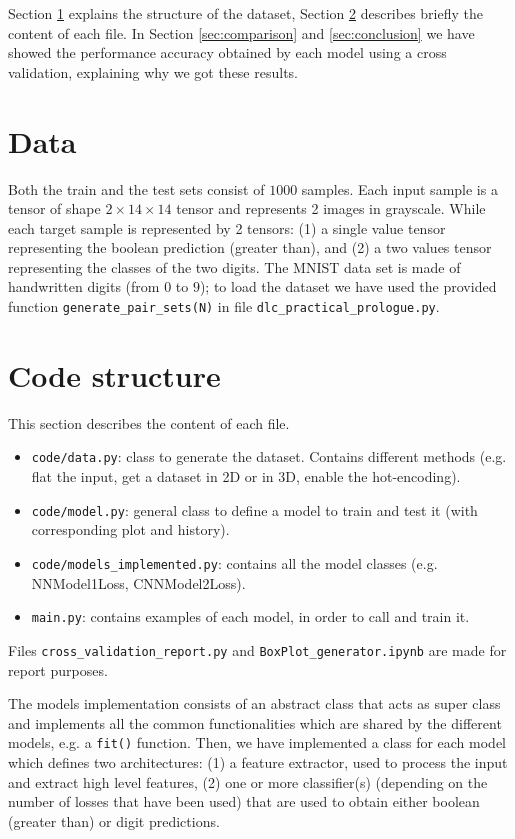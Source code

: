 \documentclass[journal, a4paper]{IEEEtran}
\begin{document}
Section \ref{sec:data} explains the structure of the dataset, Section \ref{sec:codestruc} describes briefly the content of each file. In Section \ref{sec:comparison} and \ref{sec:conclusion} we have showed the performance accuracy obtained by each model using a cross validation, explaining why we got these results.


\section{Data}
\label{sec:data}
Both the train and the test sets consist of $1000$ samples. Each input sample is a tensor of shape $2\times14\times14$ tensor and represents 2 images in grayscale. While each target sample is represented by 2 tensors: (1) a single value tensor representing the boolean prediction (greater than), and (2) a two values tensor representing the classes of the two digits. The MNIST data set is made of handwritten digits (from $0$ to $9$); to load the dataset we have used the provided function \texttt{generate\_pair\_sets(N)} in file \texttt{dlc\_practical\_prologue.py}.

\section{Code structure}
\label{sec:codestruc}
This section describes the content of each file.
\begin{itemize}
    \item \texttt{code/data.py}: class to generate the dataset. Contains different methods (e.g. flat the input, get a dataset in 2D or in 3D, enable the hot-encoding).
    \item \texttt{code/model.py}: general class to define a model to train and test it (with corresponding plot and history).
    \item \texttt{code/models\_implemented.py}: contains all the model classes (e.g. NNModel1Loss, CNNModel2Loss).
    \item \texttt{main.py}: contains examples of each model, in order to call and train it.
\end{itemize}
Files \texttt{cross\_validation\_report.py} and \texttt{BoxPlot\_generator.ipynb} are made for report purposes.

The models implementation consists of an abstract class that acts as super class and implements all the common functionalities which are shared by the different models, e.g. a \texttt{fit()} function. Then, we have implemented a class for each model which defines two architectures: (1) a feature extractor, used to process the input and extract high level features, (2) one or more classifier(s) (depending on the number of losses that have been used) that are used to obtain either boolean (greater than) or digit predictions.
\end{document}

